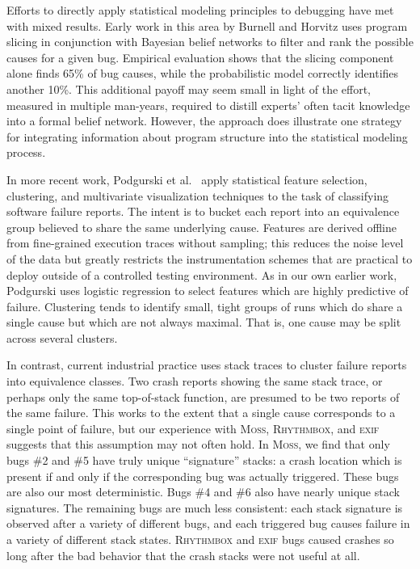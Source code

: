 \documentclass[draft]{sig-alternate}
\newcommand{\moss}{\textsc{Moss}\xspace}
\newcommand{\rhythmbox}{\textsc{Rhythmbox}\xspace}
\newcommand{\exif}{\textsc{exif}\xspace}
\begin{document}
Efforts to directly apply statistical modeling principles to debugging
have met with mixed results.  Early work in this area by Burnell and
Horvitz \cite{Burnell:1995:SCM} uses program slicing in conjunction
with Bayesian belief networks to filter and rank the possible causes
for a given bug.  Empirical evaluation shows that the slicing component
alone finds 65\% of bug causes, while the probabilistic model
correctly identifies another 10\%.  This additional payoff may seem
small in light of the effort, measured in multiple
man-years, required to distill experts' often tacit knowledge into a
formal belief network.  However, the approach does illustrate one
strategy for integrating information about program structure into the
statistical modeling process.

In more recent work, Podgurski et al.\ \cite{ICSE`03*465} apply
statistical feature selection, clustering, and multivariate
visualization techniques to the task of classifying software failure
reports.  The intent is to bucket each report into an equivalence
group believed to share the same underlying cause.  Features are
derived offline from fine-grained execution traces without sampling;
this reduces the noise level of the data but greatly restricts the
instrumentation schemes that are practical to deploy outside of a
controlled testing environment.  As in our own earlier work, Podgurski
uses logistic regression to select features which are highly
predictive of failure.  
Clustering tends to identify small, tight groups of runs which do
share a single cause but which are not always maximal.  That is, one
cause may be split across several clusters.

In contrast, current
industrial practice uses stack traces to cluster failure reports into
equivalence classes.  Two crash reports showing the same stack trace,
or perhaps only the same top-of-stack function, are presumed to be two
reports of the same failure.  This works to the extent that a single
cause corresponds to a single point of failure, but our experience
with \moss, \rhythmbox, and \exif suggests that this assumption may not often hold.  In \moss,
we find that only bugs \#2 and \#5 have truly unique ``signature'' stacks: a
crash location which is present if and only if the corresponding bug
was actually triggered.  These bugs are also our most deterministic.
Bugs \#4 and \#6 also have nearly unique stack signatures.
The remaining bugs are much less consistent: each stack signature is
observed after a variety of different bugs, and each triggered bug
causes failure in a variety of different stack states.  \rhythmbox and \exif
bugs caused crashes so long after the bad behavior that the crash stacks
were not useful at all.
\end{document}
